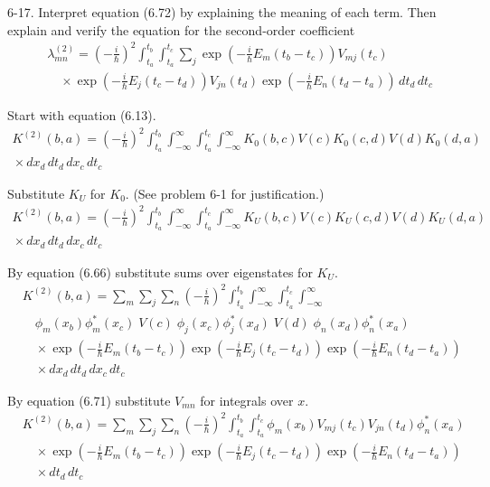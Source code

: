 \documentclass[12pt]{article}
\begin{document}
6-17.
Interpret equation (6.72) by explaining the meaning of each term.
Then explain and verify the equation for the second-order coefficient
\begin{align*}
&\lambda_{mn}^{(2)}=\left(-\frac{i}{\hbar}\right)^2
\int_{t_a}^{t_b}
\int_{t_a}^{t_c}
\sum_j
\exp\left(-\frac{i}{\hbar}E_m(t_b-t_c)\right)V_{mj}(t_c)
\\
&\quad{}\times\exp\left(-\frac{i}{\hbar}E_j(t_c-t_d)\right)V_{jn}(t_d)
\exp\left(-\frac{i}{\hbar}E_n(t_d-t_a)\right)\,dt_d\,dt_c
\tag{6.74}
\end{align*}

Start with equation (6.13).
\begin{multline*}
K^{(2)}(b,a)=\left(-\frac{i}{\hbar}\right)^2
\int_{t_a}^{t_b}
\int_{-\infty}^\infty
\int_{t_a}^{t_c}
\int_{-\infty}^\infty
K_0(b,c)V(c)K_0(c,d)V(d)K_0(d,a)
\\
{}\times dx_d\,dt_d\,dx_c\,dt_c
\end{multline*}

Substitute $K_U$ for $K_0$.
(See problem 6-1 for justification.)
\begin{multline*}
K^{(2)}(b,a)=\left(-\frac{i}{\hbar}\right)^2
\int_{t_a}^{t_b}
\int_{-\infty}^\infty
\int_{t_a}^{t_c}
\int_{-\infty}^\infty
K_U(b,c)V(c)K_U(c,d)V(d)K_U(d,a)
\\
{}\times dx_d\,dt_d\,dx_c\,dt_c
\end{multline*}

By equation (6.66) substitute sums over eigenstates for $K_U$.
\begin{align*}
&K^{(2)}(b,a)=\sum_m\sum_j\sum_n
\left(-\frac{i}{\hbar}\right)^2
\int_{t_a}^{t_b}
\int_{-\infty}^\infty
\int_{t_a}^{t_c}
\int_{-\infty}^\infty
\\
&\quad\phi_m(x_b)\phi_m^*(x_c)\;V(c)\;\phi_j(x_c)\phi_j^*(x_d)\;V(d)\;\phi_n(x_d)\phi_n^*(x_a)
\\
&\quad\times
\exp\left(-\frac{i}{\hbar}E_m(t_b-t_c)\right)
\exp\left(-\frac{i}{\hbar}E_j(t_c-t_d)\right)
\exp\left(-\frac{i}{\hbar}E_n(t_d-t_a)\right)
\\
&\quad{}\times dx_d\,dt_d\,dx_c\,dt_c
\end{align*}

By equation (6.71) substitute $V_{mn}$ for integrals over $x$.
\begin{align*}
&K^{(2)}(b,a)=\sum_m\sum_j\sum_n
\left(-\frac{i}{\hbar}\right)^2
\int_{t_a}^{t_b}
\int_{t_a}^{t_c}
\phi_m(x_b)V_{mj}(t_c)V_{jn}(t_d)\phi_n^*(x_a)
\\
&\quad\times
\exp\left(-\frac{i}{\hbar}E_m(t_b-t_c)\right)
\exp\left(-\frac{i}{\hbar}E_j(t_c-t_d)\right)
\exp\left(-\frac{i}{\hbar}E_n(t_d-t_a)\right)
\\
&\quad{}\times dt_d\,dt_c
\end{align*}
\end{document}
